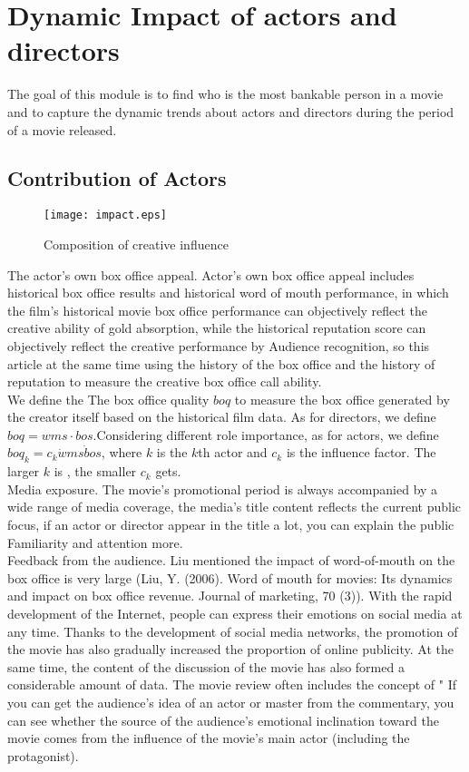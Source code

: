 \section{Dynamic Impact of actors and directors}
The goal of this module is to find who is the most bankable person in a movie and to capture the dynamic trends about actors and directors during the period of a movie released.\\

\subsection{Contribution of Actors}
\begin{figure}[!htbp]
\centering
\texttt{[image: impact.eps]}
\caption{Composition of creative influence}
\label{fig:mhin}
\end{figure}
The actor's own box office appeal. Actor's own box office appeal includes historical box office results and historical word of mouth performance, in which the film's historical movie box office performance can objectively reflect the creative ability of gold absorption, while the historical reputation score can objectively reflect the creative performance by Audience recognition, so this article at the same time using the history of the box office and the history of reputation to measure the creative box office call ability.\\
We define the The box office quality $boq$ to measure the box office generated by the creator itself based on the historical film data. As for directors, we define $boq=wms\cdot bos$.Considering different role importance, as for actors, we define $boq_k = c_k\dot wms\dot bos$, where $k$ is the $k$th actor and $c_k$ is the influence factor. The larger $k$ is , the smaller $c_k$ gets.\\
Media exposure. The movie's promotional period is always accompanied by a wide range of media coverage, the media's title content reflects the current public focus, if an actor or director appear in the title a lot, you can explain the public Familiarity and attention more.\\
Feedback from the audience. Liu mentioned the impact of word-of-mouth on the box office is very large (Liu, Y. (2006). Word of mouth for movies: Its dynamics and impact on box office revenue. Journal of marketing, 70 (3)). With the rapid development of the Internet, people can express their emotions on social media at any time. Thanks to the development of social media networks, the promotion of the movie has also gradually increased the proportion of online publicity. At the same time, the content of the discussion of the movie has also formed a considerable amount of data. The movie review often includes the concept of " If you can get the audience's idea of ​​an actor or master from the commentary, you can see whether the source of the audience's emotional inclination toward the movie comes from the influence of the movie's main actor (including the protagonist).\\
